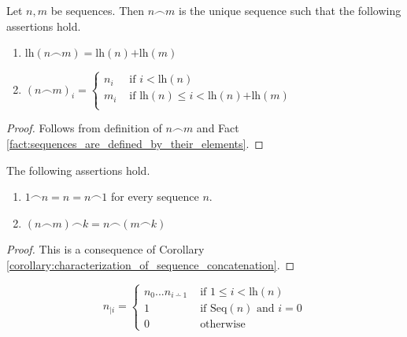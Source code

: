 \documentclass[10pt]{amsart}
\newcommand{\mle}{\boldsymbol{<}}
\newcommand{\mleq}{\boldsymbol{\leq}}
\newcommand{\meq}{\boldsymbol{=}}
\newcommand{\mplus}{\boldsymbol{+}}
\begin{document}
\begin{corollary}\label{corollary:characterization_of_sequence_concatenation}
	Let $n,m$ be sequences. Then $n \frown m$ is the unique sequence such that the following assertions hold.
	\begin{enumerate}[label=\emph{\textbf{(\arabic*)}}, leftmargin=3.0em]
		\item $\mathrm{lh}(n\frown m) \meq \mathrm{lh}(n) \mplus \mathrm{lh}(m)$
		\item $(n \frown m)_i \meq \begin{cases}
				      n_i & \mbox{ if }i \mle \mathrm{lh}(n)                                            \\
				      m_i & \mbox{ if }\mathrm{lh}(n) \mleq i \mle \mathrm{lh}(n) \mplus \mathrm{lh}(m) \\
			      \end{cases}$
	\end{enumerate}
\end{corollary}
\begin{proof}
	Follows from definition of $n \frown m$ and Fact \ref{fact:sequences_are_defined_by_their_elements}.
\end{proof}

\begin{corollary}\label{corollary:properties_of_sequence_concatenation}
	The following assertions hold.
	\begin{enumerate}[label=\emph{\textbf{(\arabic*)}}, leftmargin=3.0em]
		\item $1 \frown n \meq n \meq n \frown 1$ for every sequence $n$.
		\item $(n \frown m) \frown k \meq n\frown (m \frown k)$
	\end{enumerate}
\end{corollary}
\begin{proof}
	This is a consequence of Corollary \ref{corollary:characterization_of_sequence_concatenation}.
\end{proof}

\begin{definition}
	$$n_{\mid i} = \begin{cases}
			n_0...n_{i\dotminus 1} & \mbox{ if }1 \mleq i \mle \mathrm{lh}(n)           \\
			1                      & \mbox{ if }\mathrm{Seq}(n)\mbox{ and }i \meq 0 \\
			0                      & \mbox{ otherwise }
		\end{cases}$$
\end{definition}
\end{document}

